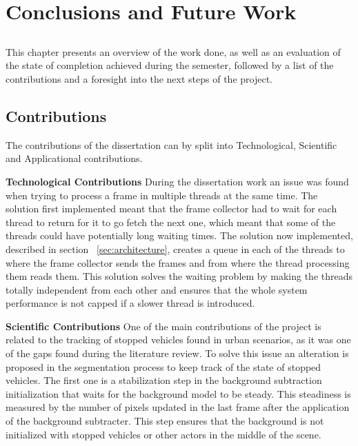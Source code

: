 
\chapter{Conclusions and Future Work} \label{chap:concl}

\section*{}

This chapter presents an overview of the work done, as well as an evaluation of the state of completion achieved during the semester, followed by a list of the contributions and a foresight into the next steps of the project. 

\section{Contributions}

The contributions of the dissertation can by split into Technological, Scientific and Applicational contributions.

\textbf{Technological Contributions} During the dissertation work an issue was found when trying to process a frame in multiple threads at the same time. The solution first implemented meant that the frame collector had to wait for each thread to return for it to go fetch the next one, which meant that some of the threads could have potentially long waiting times. The solution now implemented, described in section ~\ref{sec:architecture}, creates a queue in each of the threads to where the frame collector sends the frames and from where the thread processing them reads them. This solution solves the waiting problem by making the threads totally independent from each other and ensures that the whole system performance is not capped if a slower thread is introduced.

\textbf{Scientific Contributions} One of the main contributions of the project is related to the tracking of stopped vehicles found in urban scenarios, as it was one of the gaps found during the literature review. To solve this issue an alteration is proposed in the segmentation process to keep track of the state of stopped vehicles. The first one is a stabilization step in the background subtraction initialization that waits for the background model to be steady. This steadiness is measured by the number of pixels updated in the last frame after the application of the background subtracter. This step ensures that the background is not initialized with stopped vehicles or other actors in the middle of the scene.

